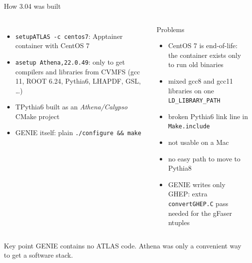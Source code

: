 \documentclass[10pt,aspectratio=169]{beamer}
\newcommand{\code}[1]{\texttt{\small #1}}
\begin{document}
\begin{frame}{How 3.04 was built}
  \begin{columns}[T]
    \begin{itemize}
      \item \code{setupATLAS -c centos7}: Apptainer container with CentOS 7
      \item \code{asetup Athena,22.0.49}: only to get compilers and libraries from CVMFS
            (gcc 11, ROOT 6.24, Pythia6, LHAPDF, GSL, \dots)
      \item TPythia6 built as an \emph{Athena/Calypso} CMake project
      \item GENIE itself: plain \code{./configure \&\& make}
    \end{itemize}
    \begin{alertblock}{Problems}
      \begin{itemize}\small
        \item CentOS 7 is end-of-life: the container exists only to run old binaries
        \item mixed gcc8 and gcc11 libraries on one \code{LD\_LIBRARY\_PATH}
        \item broken Pythia6 link line in \code{Make.include}
        \item not usable on a Mac
        \item no easy path to move to Pythia8
        \item GENIE writes only GHEP: extra \code{convertGHEP.C} pass needed for the gFaser ntuples
      \end{itemize}
    \end{alertblock}
  \end{columns}
  \vfill
  \begin{exampleblock}{Key point}
    GENIE contains no ATLAS code. Athena was only a convenient way to get a software stack.
  \end{exampleblock}
\end{frame}
\end{document}
